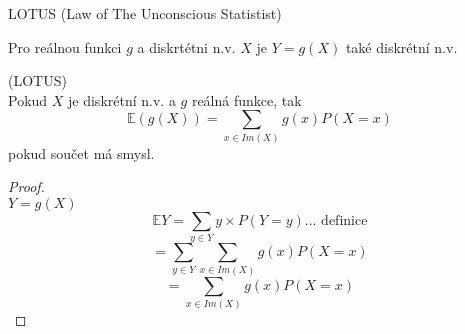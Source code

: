 \documentclass[../main.tex]{subfiles}
\begin{document}
\begin{definition}
    LOTUS (Law of The Unconscious Statistist)

    Pro reálnou funkci $g$ a diskrtétni n.v. $X$ je $Y = g(X)$ také diskrétní n.v.
    \begin{theorem}
        (LOTUS)\\
        Pokud $X$ je diskrétní n.v. a $g$ reálná funkce, tak 
        \[\mathbb{E}(g(X)) = \sum_{x\in Im(X)}g(x)P(X=x)\]
        pokud součet má smysl.
    \end{theorem}
    \begin{proof}\\
        $Y = g(X)$
        \[\mathbb{E}Y = \sum_{y\in Y} y\times P(Y=y) \text{... definice}\]
        \[= \sum_{y \in Y} \sum_{x\in Im(X)}g(x) P(X=x)\]
        \[= \sum_{x\in Im(X)} g(x) P(X=x)\]
    \end{proof}
\end{definition}
\end{document}
